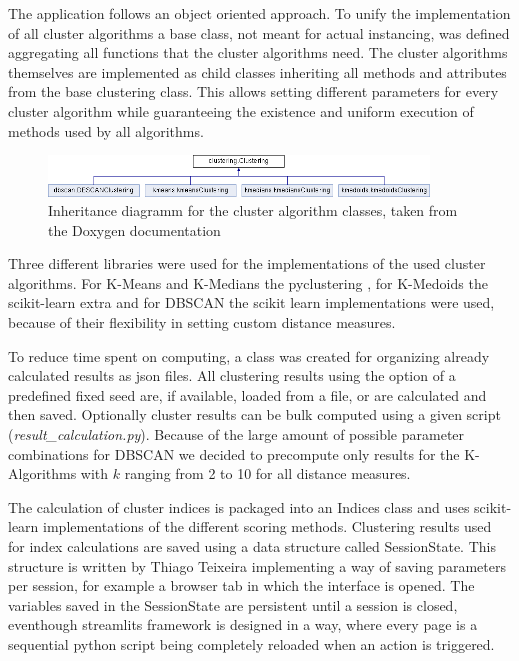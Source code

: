 The application follows an object oriented approach. To unify the implementation of all cluster algorithms a base class, not meant for actual instancing, was defined aggregating all functions that the cluster algorithms need.
The cluster algorithms themselves are implemented as child classes inheriting all methods and attributes from the base clustering class. This allows setting different parameters for every cluster algorithm while guaranteeing the existence and uniform execution of methods used by all algorithms.

\begin{figure}[H]
    \centering
    \includegraphics[width=0.9\textwidth]{../docs/html/classclustering_1_1Clustering}
    \caption{Inheritance diagramm for the cluster algorithm classes, taken from the Doxygen documentation}
\end{figure}

Three different libraries were used for the implementations of the used cluster algorithms. 
For K-Means and K-Medians the pyclustering \cite{Novikov2019}, for K-Medoids the scikit-learn extra \cite{scikit-learn-extra} and for DBSCAN the scikit learn implementations \cite{scikitlearn} were used, because of their flexibility in setting custom distance measures.

To reduce time spent on computing, a class was created for organizing already calculated results as json files. All clustering results using the option of a predefined fixed seed are, if available, loaded from a file, or are calculated and then saved. Optionally cluster results can be bulk computed using a given script (\textit{result\_calculation.py}). Because of the large amount of possible parameter combinations for DBSCAN we decided to precompute only results for the K-Algorithms with $k$ ranging from 2 to 10 for all distance measures.

The calculation of cluster indices is packaged into an Indices class and uses scikit-learn implementations of the different scoring methods. Clustering results used for index calculations are saved using a data structure called SessionState. This structure is written by Thiago Teixeira \cite{sessionstate} implementing a way of saving parameters per session, for example a browser tab in which the interface is opened. The variables saved in the SessionState are persistent until a session is closed, eventhough streamlits framework is designed in a way, where every page is a sequential python script being completely reloaded when an action is triggered. 

